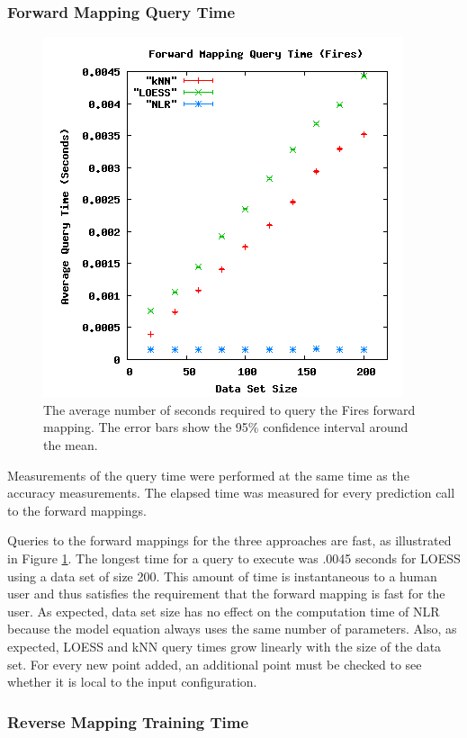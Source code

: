 \subsubsection{Forward Mapping Query Time}
\begin{figure}[ht]
\centering
\includegraphics[scale=.5]{images/results_fires/fmquery.png}
\caption{The average number of seconds required to query the Fires forward mapping.
The error bars show the 95\% confidence interval around the mean.}
\label{fig:firefmquery}
\end{figure}

Measurements of the query time were performed at the same time as the accuracy measurements.
The elapsed time was measured for every prediction call to the forward mappings.

Queries to the forward mappings for the three approaches are fast, as illustrated in Figure \ref{fig:firefmquery}.
The longest time for a query to execute was .0045 seconds for LOESS using a data set of size 200.
This amount of time is instantaneous to a human user and thus satisfies the requirement that the forward mapping is fast for the user.
As expected, data set size has no effect on the computation time of NLR because the model equation always uses the same number of parameters.
Also, as expected, LOESS and kNN query times grow linearly with the size of the data set.
For every new point added, an additional point must be checked to see whether it is local to the input configuration.


\subsubsection{Reverse Mapping Training Time}

